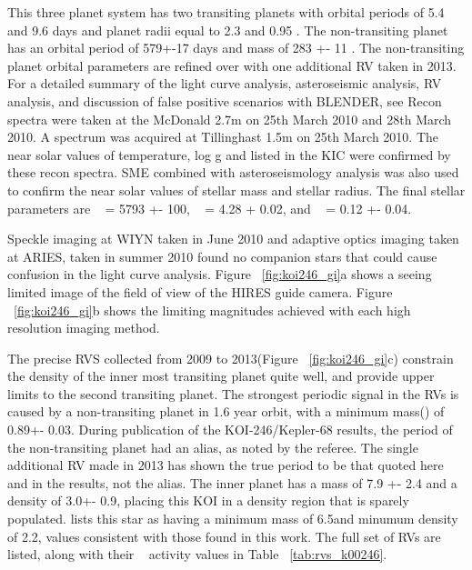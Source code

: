 \documentclass{emulateapj}
\begin{document}
 This three planet system has two transiting planets with orbital periods of 5.4 and 9.6 days and  planet radii equal to 2.3 and 0.95 \rearthe. The non-transiting planet has an orbital period of 579+-17 days and mass of 283 +- 11 \mearthe. The non-transiting planet orbital parameters are refined over \cite{Gilliland2013} with one additional RV taken in 2013.  For a detailed summary of the light curve analysis, asteroseismic analysis, RV analysis, and discussion of false positive scenarios with BLENDER, see \cite{Gilliland2013}
Recon spectra were taken at the McDonald 2.7m  on 25th March 2010 and 28th March 2010. A spectrum was acquired at Tillinghast 1.5m on 25th March 2010. The near solar values of temperature, log g and \vsini listed in the KIC were confirmed by these recon spectra. SME combined with asteroseismology analysis was also used to confirm the near solar values of stellar mass and stellar radius.  The final stellar parameters are \teff~ = 5793 +- 100, \logg~ = 4.28 + 0.02, and \feh~ = 0.12 +- 0.04.

Speckle imaging at WIYN taken in June 2010 and adaptive optics imaging taken at ARIES, taken in summer 2010 found no companion stars that could cause confusion in the light curve analysis. Figure ~\ref{fig:koi246_gi}a shows a seeing limited  image of the field of view of the HIRES guide camera.  Figure  ~\ref{fig:koi246_gi}b shows the limiting magnitudes achieved with each high resolution imaging method.  

 The precise RVS collected from 2009 to 2013(Figure  ~\ref{fig:koi246_gi}c) constrain the density of the inner most transiting planet quite well, and provide upper limits to the second transiting planet. The strongest periodic signal in the RVs is caused by a non-transiting planet in 1.6  year orbit, with a minimum mass(\msini) of 0.89+- 0.03\mjupe. During publication of the KOI-246/Kepler-68 results, the period of the non-transiting planet had an alias, as noted by the referee. The single additional RV made in 2013 has shown the true period to be that quoted here and in the \cite{Gilliland2013} results, not the alias. The inner planet has a mass of 7.9 +- 2.4 \mearth and a density of 3.0+- 0.9\gcc, placing this KOI in a density region that is sparely populated. 
 \cite{Lopez2012} lists this star as having a minimum mass of  6.5\mearth and minumum density of  2.2\gcc, values consistent with those found in this work. The full set of RVs are listed, along with their \rphk~ activity values in Table ~\ref{tab:rvs_k00246}.
  
\end{document}
